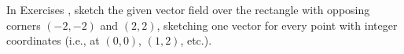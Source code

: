 {\noindent In Exercises}
{, sketch the given vector field over the rectangle with opposing corners $(-2,-2)$ and $(2,2)$, sketching one vector for every point with integer coordinates (i.e., at $(0,0)$, $(1,2)$, etc.).}
